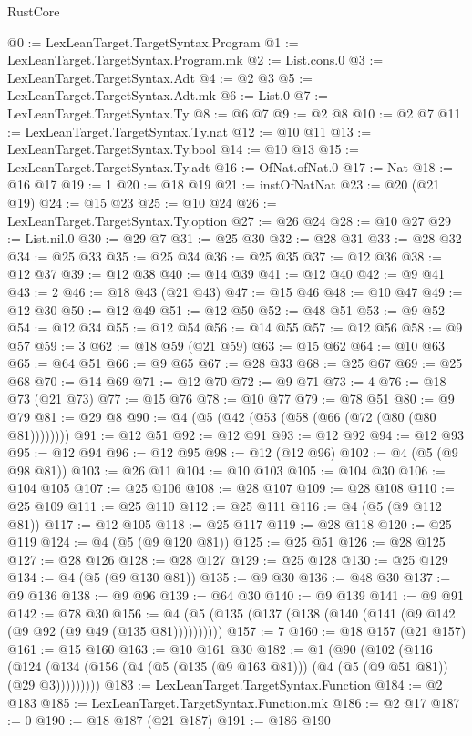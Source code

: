 \begin{lexlean}{RustCore}
\begin{coremodule}
@0 := LexLeanTarget.TargetSyntax.Program
@1 := LexLeanTarget.TargetSyntax.Program.mk
@2 := List.cons.{0}
@3 := LexLeanTarget.TargetSyntax.Adt
@4 := @2 @3
@5 := LexLeanTarget.TargetSyntax.Adt.mk
@6 := List.{0}
@7 := LexLeanTarget.TargetSyntax.Ty
@8 := @6 @7
@9 := @2 @8
@10 := @2 @7
@11 := LexLeanTarget.TargetSyntax.Ty.nat
@12 := @10 @11
@13 := LexLeanTarget.TargetSyntax.Ty.bool
@14 := @10 @13
@15 := LexLeanTarget.TargetSyntax.Ty.adt
@16 := OfNat.ofNat.{0}
@17 := Nat
@18 := @16 @17
@19 := 1
@20 := @18 @19
@21 := instOfNatNat
@23 := @20 (@21 @19)
@24 := @15 @23
@25 := @10 @24
@26 := LexLeanTarget.TargetSyntax.Ty.option
@27 := @26 @24
@28 := @10 @27
@29 := List.nil.{0}
@30 := @29 @7
@31 := @25 @30
@32 := @28 @31
@33 := @28 @32
@34 := @25 @33
@35 := @25 @34
@36 := @25 @35
@37 := @12 @36
@38 := @12 @37
@39 := @12 @38
@40 := @14 @39
@41 := @12 @40
@42 := @9 @41
@43 := 2
@46 := @18 @43 (@21 @43)
@47 := @15 @46
@48 := @10 @47
@49 := @12 @30
@50 := @12 @49
@51 := @12 @50
@52 := @48 @51
@53 := @9 @52
@54 := @12 @34
@55 := @12 @54
@56 := @14 @55
@57 := @12 @56
@58 := @9 @57
@59 := 3
@62 := @18 @59 (@21 @59)
@63 := @15 @62
@64 := @10 @63
@65 := @64 @51
@66 := @9 @65
@67 := @28 @33
@68 := @25 @67
@69 := @25 @68
@70 := @14 @69
@71 := @12 @70
@72 := @9 @71
@73 := 4
@76 := @18 @73 (@21 @73)
@77 := @15 @76
@78 := @10 @77
@79 := @78 @51
@80 := @9 @79
@81 := @29 @8
@90 := @4 (@5 (@42 (@53 (@58 (@66 (@72 (@80 (@80 @81))))))))
@91 := @12 @51
@92 := @12 @91
@93 := @12 @92
@94 := @12 @93
@95 := @12 @94
@96 := @12 @95
@98 := @12 (@12 @96)
@102 := @4 (@5 (@9 @98 @81))
@103 := @26 @11
@104 := @10 @103
@105 := @104 @30
@106 := @104 @105
@107 := @25 @106
@108 := @28 @107
@109 := @28 @108
@110 := @25 @109
@111 := @25 @110
@112 := @25 @111
@116 := @4 (@5 (@9 @112 @81))
@117 := @12 @105
@118 := @25 @117
@119 := @28 @118
@120 := @25 @119
@124 := @4 (@5 (@9 @120 @81))
@125 := @25 @51
@126 := @28 @125
@127 := @28 @126
@128 := @28 @127
@129 := @25 @128
@130 := @25 @129
@134 := @4 (@5 (@9 @130 @81))
@135 := @9 @30
@136 := @48 @30
@137 := @9 @136
@138 := @9 @96
@139 := @64 @30
@140 := @9 @139
@141 := @9 @91
@142 := @78 @30
@156 := @4 (@5 (@135 (@137 (@138 (@140 (@141 (@9 @142 (@9 @92 (@9 @49 (@135 @81))))))))))
@157 := 7
@160 := @18 @157 (@21 @157)
@161 := @15 @160
@163 := @10 @161 @30
@182 := @1
    (@90
      (@102
        (@116 (@124 (@134 (@156 (@4 (@5 (@135 (@9 @163 @81))) (@4 (@5 (@9 @51 @81)) (@29 @3)))))))))
@183 := LexLeanTarget.TargetSyntax.Function
@184 := @2 @183
@185 := LexLeanTarget.TargetSyntax.Function.mk
@186 := @2 @17
@187 := 0
@190 := @18 @187 (@21 @187)
@191 := @186 @190

\end{coremodule}
\end{lexlean}
